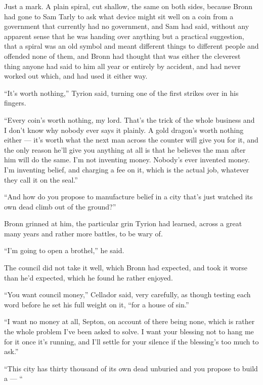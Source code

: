 Just a mark. A plain spiral, cut shallow, the same on both sides, because Bronn had gone to Sam Tarly to ask what device might sit well on a coin from a government that currently had no government, and Sam had said, without any apparent sense that he was handing over anything but a practical suggestion, that a spiral was an old symbol and meant different things to different people and offended none of them, and Bronn had thought that was either the cleverest thing anyone had said to him all year or entirely by accident, and had never worked out which, and had used it either way.

“It’s worth nothing,” Tyrion said, turning one of the first strikes over in his fingers.

“Every coin’s worth nothing, my lord. That’s the trick of the whole business and I don’t know why nobody ever says it plainly. A gold dragon’s worth nothing either — it’s worth what the next man across the counter will give you for it, and the only reason he’ll give you anything at all is that he believes the man after him will do the same. I’m not inventing money. Nobody’s ever invented money. I’m inventing belief, and charging a fee on it, which is the actual job, whatever they call it on the seal.”

“And how do you propose to manufacture belief in a city that’s just watched its own dead climb out of the ground?”

Bronn grinned at him, the particular grin Tyrion had learned, across a great many years and rather more battles, to be wary of.

“I’m going to open a brothel,” he said.

\sceneBreak

The council did not take it well, which Bronn had expected, and took it worse than he’d expected, which he found he rather enjoyed.

“You want council money,” Cellador said, very carefully, as though testing each word before he set his full weight on it, “for a house of sin.”

“I want no money at all, Septon, on account of there being none, which is rather the whole problem I’ve been asked to solve. I want your blessing not to hang me for it once it’s running, and I’ll settle for your silence if the blessing’s too much to ask.”

“This city has thirty thousand of its own dead unburied and you propose to build a — “

